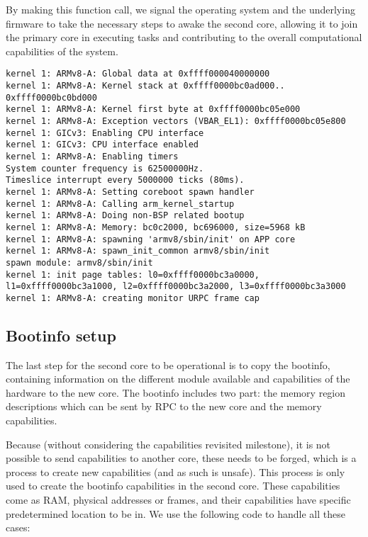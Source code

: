 By making this function call, we signal the operating system and the underlying firmware to take the necessary steps to awake the second core, allowing it to join the primary core in executing tasks and contributing to the overall computational capabilities of the system.

\begin{lstlisting}[caption={Output of the first core},captionpos=b,frame=single,breaklines]
kernel 1: ARMv8-A: Global data at 0xffff000040000000
kernel 1: ARMv8-A: Kernel stack at 0xffff0000bc0ad000.. 0xffff0000bc0bd000
kernel 1: ARMv8-A: Kernel first byte at 0xffff0000bc05e000
kernel 1: ARMv8-A: Exception vectors (VBAR_EL1): 0xffff0000bc05e800
kernel 1: GICv3: Enabling CPU interface
kernel 1: GICv3: CPU interface enabled
kernel 1: ARMv8-A: Enabling timers
System counter frequency is 62500000Hz.
Timeslice interrupt every 5000000 ticks (80ms).
kernel 1: ARMv8-A: Setting coreboot spawn handler
kernel 1: ARMv8-A: Calling arm_kernel_startup
kernel 1: ARMv8-A: Doing non-BSP related bootup 
kernel 1: ARMv8-A: Memory: bc0c2000, bc696000, size=5968 kB
kernel 1: ARMv8-A: spawning 'armv8/sbin/init' on APP core
kernel 1: ARMv8-A: spawn_init_common armv8/sbin/init
spawn module: armv8/sbin/init
kernel 1: init page tables: l0=0xffff0000bc3a0000, l1=0xffff0000bc3a1000, l2=0xffff0000bc3a2000, l3=0xffff0000bc3a3000
kernel 1: ARMv8-A: creating monitor URPC frame cap
\end{lstlisting}

\subsection{Bootinfo setup}

The last step for the second core to be operational is to copy the bootinfo, containing information on the different module available and capabilities of the hardware to the new core. The bootinfo includes two part: the memory region descriptions which can be sent by RPC to the new core and the memory capabilities. 

Because (without considering the capabilities revisited milestone), it is not possible to send capabilities to another core, these needs to be forged, which is a process to create new capabilities (and as such is unsafe). This process is only used to create the bootinfo capabilities in the second core. These capabilities come as RAM, physical addresses or frames, and their capabilities have specific predetermined location to be in. We use the following code to handle all these cases:

